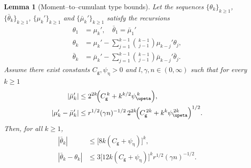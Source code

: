 \documentclass{article}
\newtheorem{lemma}{Lemma}[section]
\begin{document}
\begin{lemma}[Moment--to--cumulant type bounds]\label{lemma:empirical-cumulant-var}
Let the sequences $\{\theta_k\}_{k\ge 1}$, $\{\bar\theta_k\}_{k\ge 1}$,  
$\{\mu_k'\}_{k\ge 1}$ and $\{\bar\mu_k'\}_{k\ge 1}$ satisfy the recursions
\begin{align}
  \theta_1 &= \mu_k', \quad \bar{\theta}_1 = \bar{\mu}_1' \label{eq:theta-init} \\
  \theta_k
  &=\mu_k'
    -\sum_{j=1}^{k-1}\binom{k-1}{\,j-1\,}\mu_{k-j}'\theta_j, \label{eq:theta-recursion} \\
  \bar\theta_k
  &=\bar\mu_k'
    -\sum_{j=1}^{k-1}\binom{k-1}{\,j-1\,}\bar\mu_{k-j}'\bar\theta_j.
    \label{eq:theta-bar-recursion}
\end{align}
Assume there exist constants $C_{\mathsf g},\psi_{\upeta}>0$ and
$l,\gamma,n\in(0,\infty)$ such that for every $k\ge 1$
\begin{align}
  |\bar\mu_k'|
    &\le 2^{2k}\!\Bigl(C_{\mathsf g}^{\,k}+k^{k/2}\psi_{\upeta}^{\,k}\Bigr),
        \label{eq:mu-bar-bound}\\
  |\mu_k'-\bar\mu_k'|
    &\le r^{1/2}(\gamma n)^{-1/2}\,
        2^{2k}\!\Bigl(C_{\mathsf g}^{\,2k}+k^{k}\psi_{\upeta}^{\,2k}\Bigr)^{1/2}.
        \label{eq:mu-diff-bound}
\end{align}
Then, for all $k\ge 1$,
\begin{align}
  |\bar\theta_k|
    &\le \big[8k(C_{\mathsf{g}}+\psi_{\upeta})\big]^k, 
       \label{eq:theta-bar-bound}\\
  |\bar\theta_k-\theta_k|
    &\le 3\big[12k(C_{\mathsf g}+\psi_{\upeta})\big]^k r^{1/2}(\gamma n)^{-1/2}.
       \label{eq:theta-diff-bound}
\end{align}
\end{lemma}
\end{document}
